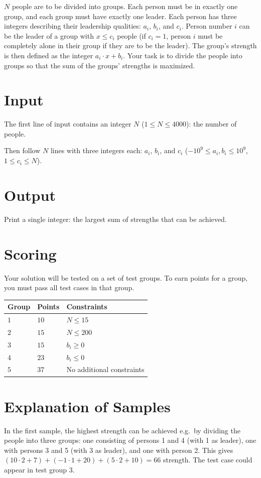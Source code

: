 
$N$ people are to be divided into groups.
Each person must be in exactly one group, and each group must have exactly one leader.
Each person has three integers describing their leadership qualities: $a_i$, $b_i$, and $c_i$.
Person number $i$ can be the leader of a group with $x \le c_i$ people
(if $c_i=1$, person $i$ must be completely alone in their group if they are to be the leader).
The group's strength is then defined as the integer $a_i\cdot x + b_i$.
Your task is to divide the people into groups so that the sum of the groups' strengths is maximized.

\section*{Input}
The first line of input contains an integer $N$ ($1 \le N \le 4000$): the number of people.

Then follow $N$ lines with three integers each: $a_i$, $b_i$, and $c_i$ ($-10^9 \le a_i, b_i \le 10^9$, $1 \le c_i \le N$).

\section*{Output}

Print a single integer: the largest sum of strengths that can be achieved.

\section*{Scoring}
Your solution will be tested on a set of test groups.
To earn points for a group, you must pass all test cases in that group.

\noindent
\begin{tabular}{| l | l | l |}
  \hline
  Group & Points & Constraints \\ \hline
  $1$   & $10$       &  $N \le 15$ \\ \hline
  $2$   & $15$       &  $N \le 200$ \\ \hline
  $3$   & $15$       &  $b_i \ge 0$ \\ \hline
  $4$   & $23$       &  $b_i \le 0$ \\ \hline
  $5$   & $37$       &  No additional constraints \\ \hline
\end{tabular}

\section*{Explanation of Samples}
In the first sample, the highest strength can be achieved e.g.\ by dividing the people into three groups:
one consisting of persons 1 and 4 (with 1 as leader), one with persons 3 and 5 (with 3 as leader), and one with person 2.
This gives $(10 \cdot 2 + 7) + (-1 \cdot 1 + 20) + (5 \cdot 2 + 10) = 66$ strength.
The test case could appear in test group 3.

